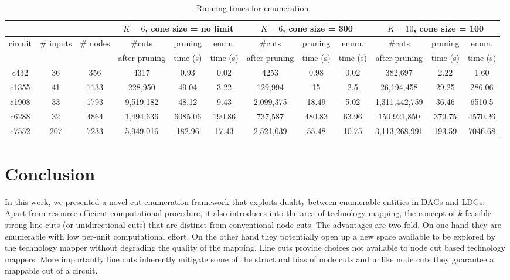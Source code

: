 \documentclass[journal]{IEEEtran}
\begin{document}
\begin{table*}[t]
\caption{Running times for enumeration}
\label{tab:enumreduced}
\def\thefootnote{a}\footnotesize
\centering
\begin{tabular}{|c|c|c|c|c|c|c|c|c|c|c|c|}
\cline{1-12}
& & & \multicolumn{3}{|c|}{$K = 6$, cone size = no limit}& \multicolumn{3}{|c|}{$K = 6$, cone size = 300}&\multicolumn{3}{|c|}{$K = 10$, cone size = 100}\\ \hline
{circuit} & {\# inputs} & {\# nodes} & {$\#$cuts} & pruning & enum.& {$\#$cuts} & {pruning} & enum. & {$\#$cuts} & {pruning} & enum.\\
             &                &              & after pruning& time (s) & time (s) & after pruning & time (s) & time (s) & after pruning & time (s) & time (s)\\ \hline
c432 & 36 & 356 & 4317 & 0.93 & 0.02 & 4253 & 0.98 & 0.02 & 382,697 & 2.22 & 1.60\\ \hline
c1355 & 41 & 1133 & 228,950 & 49.04 & 3.22  & 129,994 & 15 & 2.5 & 26,194,458 & 29.25 & 286.06\\ \hline
c1908 & 33 & 1793  & 9,519,182 & 48.12 & 9.43 & 2,099,375 & 18.49 & 5.02 & 1,311,442,759 & 36.46 & 6510.5 \\ \hline
c6288 & 32 & 4864  & 1,494,636 & 6085.06 & 190.86 & 737,587 & 480.83 & 63.96 & 150,921,850 & 379.75 & 4570.26 \\ \hline
c7552 & 207 & 7233  & 5,949,016 & 182.96 & 17.43 & 2,521,039 & 55.48 & 10.75 & 3,113,268,991 & 193.59 & 7046.68 \\ \hline
\end{tabular}
\end{table*}



\section{Conclusion}

In this work, we presented a novel cut enumeration framework that exploits duality between enumerable entities in DAGs and LDGs. Apart from resource efficient computational procedure, it also introduces into the area of technology mapping, the concept of $k$-feasible strong line cuts (or unidirectional cuts) that are distinct from conventional node cuts. The advantages are two-fold. On one hand they are enumerable with low per-unit computational effort. On the other hand they potentially open up a new space available to be explored by the technology mapper without degrading the quality of the mapping. Line cuts provide choices not available to node cut based technology mappers. More importantly line cuts inherently mitigate some of the structural bias of node cuts and unlike node cuts they guarantee a mappable cut of a circuit.
\end{document}
